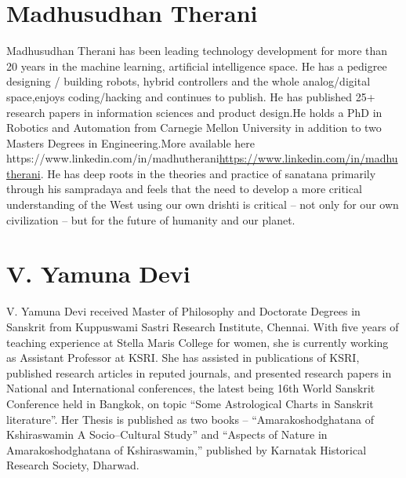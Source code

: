 \section*{Madhusudhan Therani}

Madhusudhan Therani has been leading technology development for more than 20 years in the machine learning, artificial intelligence\break
 space. He has a pedigree designing / building robots, hybrid controllers and the whole analog/digital space,enjoys coding/hacking and continues to publish. He has published 25+ research papers in information sciences and product design.He holds a PhD in Robotics and Automation from Carnegie Mellon University in addition to two Masters Degrees in Engineering.More available here https://www.linkedin.com/in/madhutherani\url{https://www.linkedin.com/in/madhutherani}. He has deep roots in the theories and practice of sanatana primarily through his sampradaya and feels that the need to develop a more critical understanding of the West using our own drishti is critical – not only for our own civilization – but for the future of humanity and our planet.

\section*{V. Yamuna Devi}

V. Yamuna Devi received Master of Philosophy and Doctorate Degrees in Sanskrit from Kuppuswami Sastri Research Institute, Chennai. With five years of teaching experience at Stella Maris College for women, she is currently working as Assistant Professor at KSRI. She has assisted in publications of KSRI, published research articles in reputed journals, and presented research papers in National and International conferences, the latest being 16th World Sanskrit Conference held in Bangkok, on topic “Some Astrological Charts in Sanskrit literature”. Her Thesis is published as two books – “Amarakoshodghatana of Kshiraswamin A Socio–Cultural Study” and “Aspects of Nature in Amarakoshodghatana of Kshiraswamin,” published by Karnatak Historical Research Society, Dharwad.

